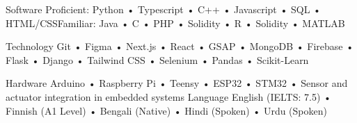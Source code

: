

\begin{cvskills}

  \vspace{-0.8mm}
  \cvskill
    {Software} %
    {Proficient: Python • Typescript • C++ • Javascript • SQL • HTML/CSS\space\space\space Familiar: Java • C • PHP • Solidity • R • Solidity • MATLAB}%

    \vspace{-0.8mm}
  \cvskill
    {Technology} %
    {Git • Figma • Next.js • React • GSAP • MongoDB • Firebase • Flask • Django • Tailwind CSS • Selenium • Pandas • Scikit-Learn } %

    \vspace{-0.8mm}
  \cvskill
    {Hardware} %
    {Arduino • Raspberry Pi • Teensy • ESP32 • STM32 • Sensor and actuator integration in embedded systems} %
  \cvskill
    {Language} %
    {English (IELTS: 7.5) • Finnish (A1 Level) • Bengali (Native) • Hindi (Spoken) • Urdu (Spoken) } %

\end{cvskills}
